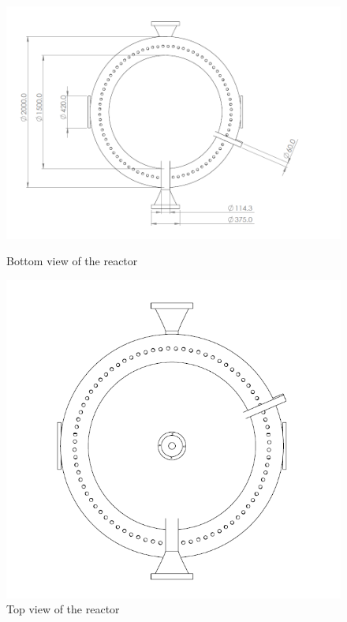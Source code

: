\begin{figure}[h]
    \begin{minipage}[t]{0.6\linewidth}
        \includegraphics[width=\linewidth]{chapters/2-reaction/figures/FYD reactor bottom view with calc.PNG}
        \caption{Bottom view of the reactor}
        \label{fig:reactorbottom}
    \end{minipage}\hfill
    \begin{minipage}[t]{0.4\linewidth}
        \includegraphics[width=\linewidth]{chapters/2-reaction/figures/FYD reactor top view.PNG}
        \caption{Top view of the reactor}
        \label{fig:reactortop}
    \end{minipage}
\end{figure}
